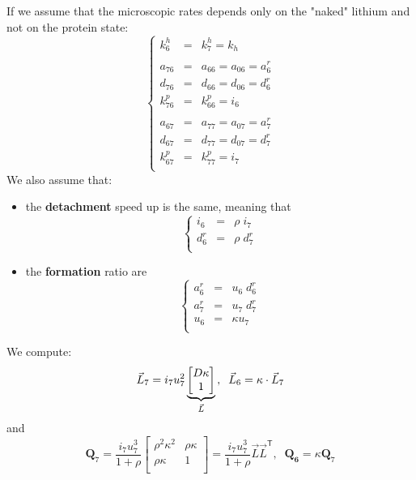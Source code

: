 \documentclass[aps,onecolumn,11pt]{revtex4}
\newcommand{\mytrn}[1]{{#1}^{\!\mathsf{T}}}
\newcommand{\mymat}[1]{{\bm{#1}}}
\begin{document}
If we assume that the microscopic rates depends only on the "naked" lithium and not on the protein state:
\begin{equation}
\label{eq:indep}
\left\lbrace
\begin{array}{rcl}
k^h_6    & = & k^h_7 = k_h\\
\\
a_{76}   & = & a_{66} = a_{06} = a^r_6\\
d_{76}   & = & d_{66} = d_{06} = d^r_6\\
k^p_{76} & = & k^p_{66} = i_6\\
\\
a_{67}   & = & a_{77} = a_{07} = a^r_7 \\
d_{67}   & = & d_{77} = d_{07} = d^r_7\\
k^p_{67} & = & k^p_{77} = i_7\\
\end{array}
\right.
\end{equation}
We also assume that:
\begin{itemize}
\item the {\bf detachment} speed up is the same, meaning that
\begin{equation}
\left\lbrace
\begin{array}{rcl}
	i_6 & = & \rho \; i_7\\
	d^r_6 & = & \rho \; d^r_7\\
\end{array}
\right.
\end{equation}
\item the {\bf formation} ratio are
\begin{equation}
\left\lbrace
\begin{array}{rcl}
	a^r_6 & = & u_6 \; d^r_6\\
	a^r_7 & = & u_7 \; d^r_7 \\
	u_6   & = & \kappa u_7 \\
\end{array}
\right.
\end{equation}
\end{itemize}
We compute:
\begin{equation}
	\vec{L}_7  = i_7 u_7^2 
	\underbrace{
	\begin{bmatrix}
	D\kappa\\
	1
	\end{bmatrix}
	}_{\vec{L}}
	\\,
	\;\;\vec{L}_6 = \kappa \cdot \vec{L}_7
\end{equation}
and
\begin{equation}
\mymat{Q}_7 = \dfrac{i_7 u_7^3}{1+\rho}
\begin{bmatrix}
	\rho^2 \kappa^2 & \rho\kappa \\
	\rho\kappa      & 1\\
\end{bmatrix}
= \dfrac{i_7 u_7^3}{1+\rho} \vec{L} \mytrn{\vec{L}},\;\; \mymat{Q_6} = \kappa \mymat{Q}_7
\end{equation}
\end{document}
